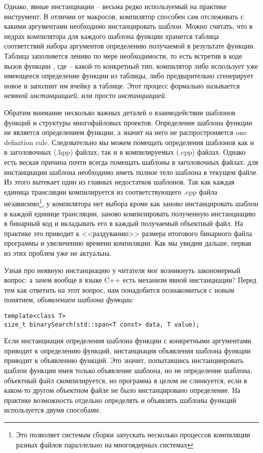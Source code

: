 Однако, явные инстанциации -- весьма редко используемый на практике инструмент. В отличии от макросов, компилятор способен сам отслеживать с какими аргументами необходимо инстанцировать шаблон. Можно считать, что в недрах компилятора для каждого шаблона функции хранится таблица соответствий набора аргументов определению получаемой в результате функции. Таблица заполняется лениво по мере необходимости, то есть встретив в коде вызов функции , где  -- какой-то конкретный тип, компилятор либо использует уже имеющееся определение функции из таблицы, либо предварительно сгенерирует новое и заполнит им ячейку в таблице. Этот процесс формально называется \textit{неявной инстанциацией}, или просто \textit{инстанциацией}.

Обратим внимание несколько важных деталей о взаимодействии шаблонов функций и структуры многофайловых проектов. Определение шаблона функции не является определением функции, а значит на него не распростроняется one definition rule. Следовательно мы можем помещать определения шаблонов как и в заголовочных (.hpp) файлах, так и в компилируемых (.cpp) файлах. Однако есть веская причина почти всегда помещать шаблоны в заголовочных файлах: для инстанциации шаблона необходимо иметь полное тело шаблона в текущем файле. Из этого вытекает один из главных недостатков шаблонов. Так как каждая единица трансляции компилируется из соответствующего .cpp файла независимо\footnote{Это позволяет системам сборки запускать несколько процессов компиляции разных файлов параллельно на многоядерных системах}, у компилятора нет выбора кроме как заново инстанцировать шаблон в каждой единице трансляции, заново компилировать полученную инстанциацию в бинарный код и вкладывать его в каждый получаемый объектный файл. На практике это приводит к <<раздуванию>> размера итогового бинарного файла программы и увеличению времени компиляции. Как мы увидим дальше, первая из этих проблем уже не актуальна.

Узнав про неявную инстанциацию у читателя мог возникнуть закономерный вопрос: а зачем вообще в языке C++ есть механизм явной инстанциации? Перед тем как ответить на этот вопрос, нам понадобится познакомиться с новым понятием, \textit{объявлением шаблона функции}:
\begin{verbatim}
template<class T>
size_t binarySearch(std::span<T const> data, T value);
\end{verbatim}
Если инстанциация определения шаблона функции с конкретными аргументами приводит к определению функций, инстанциация объявления шаблона функции приводит к объявлению функций. Это значит, попытавшись инстанциировать шаблон функции имея только объявление шаблона, но не определение шаблона, объектный файл скомпилируется, но программа в целом не слинкуется, если в каком-то другом объектном файле не было инстанцировано определение. На практике возможность отдельно определять и объявлять шаблоны функций используется двумя способами. 

